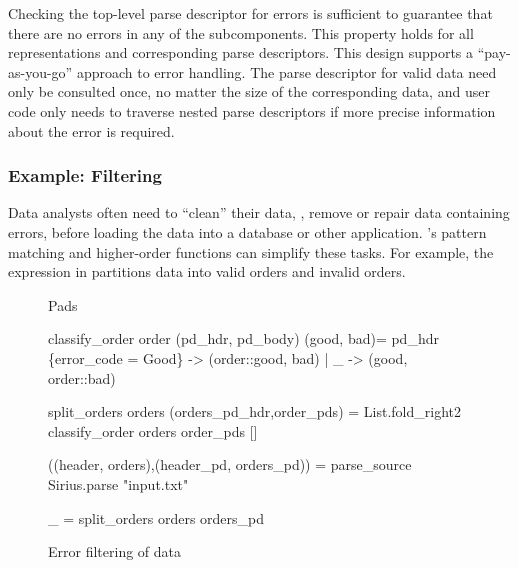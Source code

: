 Checking the top-level parse descriptor for errors is sufficient to
guarantee that there are no errors in any of the subcomponents.  This
property holds for all representations and corresponding parse
descriptors.  This design supports a ``pay-as-you-go'' approach to
error handling. The parse descriptor for valid data need only be
consulted once, no matter the size of the corresponding data, and user
code only needs to traverse nested parse descriptors if more
precise information about the error is required.

\subsubsection{Example: Filtering}
\label{sec:ex-filter}

Data analysts often need to ``clean'' their data, \ie{}, remove or
repair data containing errors, before loading the data into a database
or other application.  \ocaml{}'s pattern matching and higher-order
functions can simplify these tasks.  For example, the expression in
 partitions \dibbler{} data into valid
orders and invalid orders.  

\begin{figure}
\begin{code}\scriptsize
{} Pads

 classify_order order (pd\_hdr, pd\_body) (good, bad)=
    pd\_hdr 
    \{error_code = Good\} -> (order::good, bad)
   | _                  -> (good, order::bad)

 split_orders orders (orders_pd_hdr,order_pds) = 
   List.fold_right2 classify_order orders order_pds []

 ((header, orders),(header_pd, orders_pd)) = 
   parse_source Sirius.parse "input.txt"

 _ = split_orders orders orders_pd\end{code} 
\caption{Error filtering of \dibbler{} data}
\label{fig:ex-data-clean}
\end{figure}

